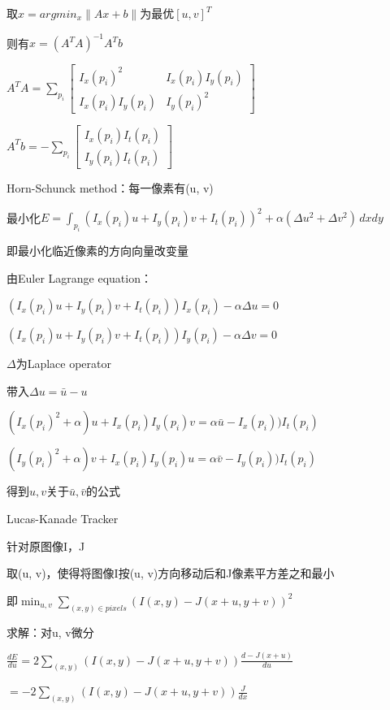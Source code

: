 \documentclass[UTF8]{ctexart}
\begin{document}
  \quad 取$x = argmin_x\|Ax + b\|$为最优$[u, v]^T$

  \quad 则有$x = (A^TA)^{-1}A^Tb$

  \quad \quad $A^TA = \sum_{p_i}
    \begin{bmatrix}
      I_x(p_i)^2 & I_x(p_i)I_y(p_i) \\ 
      I_x(p_i)I_y(p_i) & I_y(p_i)^2
      \end{bmatrix}$

  \quad \quad $A^Tb = - \sum_{p_i}
    \begin{bmatrix}
      I_x(p_i)I_t(p_i) \\ 
      I_y(p_i)I_t(p_i)
      \end{bmatrix}$

  Horn-Schunck method：每一像素有(u, v)

  \quad 最小化$E = \int_{p_i} (I_x(p_i)u + I_y(p_i)v + I_t(p_i))^2 + \alpha (\Delta u^2 + \Delta v^2) \,dxdy $

  \quad \quad 即最小化临近像素的方向向量改变量

  \quad 由Euler Lagrange equation：

  \quad \quad $(I_x(p_i)u + I_y(p_i)v + I_t(p_i))I_x(p_i) - \alpha\Delta u = 0$
  
  \quad \quad $(I_x(p_i)u + I_y(p_i)v + I_t(p_i))I_y(p_i) - \alpha\Delta v = 0$
 
  \quad \quad \quad $\Delta$为Laplace operator

  \quad 带入$\Delta u = \bar{u} - u$

  \quad \quad $(I_x(p_i)^2 + \alpha)u + I_x(p_i)I_y(p_i)v = \alpha \bar{u} - I_x(p_i))I_t(p_i)$
  
  \quad \quad $(I_y(p_i)^2 + \alpha)v + I_x(p_i)I_y(p_i)u = \alpha \bar{v} - I_y(p_i))I_t(p_i)$

  \quad 得到$u, v$关于$\bar{u}, \bar{v}$的公式

  Lucas-Kanade Tracker

  \quad 针对原图像I，J

  \quad 取(u, v)，使得将图像I按(u, v)方向移动后和J像素平方差之和最小

  \quad \quad 即$\min_{u, v}\sum_{(x, y) \in pixels}(I(x, y) - J(x + u, y + v))^2$

  \quad 求解：对u, v微分

  \quad \quad $\frac{dE}{du} = 2\sum_{(x, y)}(I(x, y) - J(x + u, y  + v))\frac{d-J(x + u)}{du}$

  \quad \quad \quad $ = -2\sum_{(x, y)}(I(x, y) - J(x + u, y  + v))\frac{J}{dx}$
\end{document}
